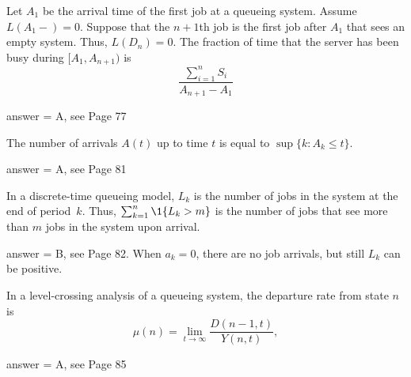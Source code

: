 \begin{exercise}[201802]
Let $A_1$ be the arrival time of the first job at a queueing system. Assume $L(A_1-)=0$. Suppose that the $n+1$th job is the first job after $A_1$ that sees an empty system.  Thus,
 $L(D_n)=0$.  The fraction of time that the server has been busy during $[A_1, A_{n+1})$     is
        \begin{equation*}
\frac{\sum_{i=1}^n S_i}{A_{n+1}-A_1} 
        \end{equation*}

\begin{solution}
answer = A, see Page 77
\end{solution}
\end{exercise}

\begin{exercise}[201802]
The number of arrivals $A(t)$ up to time $t$ is equal to $\sup\{k : A_k\leq t\}$. 
\begin{solution}
answer = A, see Page 81
\end{solution}
\end{exercise}

\begin{exercise}[201802]
In a discrete-time queueing model, $L_k$ is the number of jobs in the system at the end of period~$k$. Thus, $\sum_{k=1}^n \1{L_k > m}$ is  the number of jobs that see more than $m$ jobs in the system upon arrival. 
\begin{solution}
answer = B, see Page 82. When $a_k=0$, there are no job arrivals, but still $L_k$ can be positive.
\end{solution}
\end{exercise}

\begin{exercise}[201802]
In a level-crossing analysis of a queueing system,  the departure rate from state $n$ is 
\begin{equation*}
  \mu(n) = \lim_{t\to\infty} \frac{D(n-1,t)}{Y(n,t)},
\end{equation*}

\begin{solution}
answer = A, see Page 85
\end{solution}
\end{exercise}

